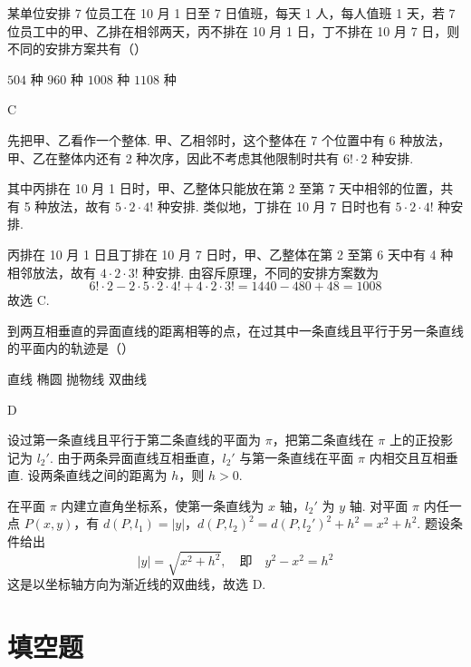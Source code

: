 \begin{problem}
某单位安排 7 位员工在 10 月 1 日至 7 日值班，每天 1 人，每人值班 1 天，若 7 位员工中的甲、乙排在相邻两天，丙不排在 10 月 1 日，丁不排在 10 月 7 日，则不同的安排方案共有（\quad）

\choices
    {\(504\) 种}
    {\(960\) 种}
    {\(1008\) 种}
    {\(1108\) 种}

\begin{answer}
C
\end{answer}

\begin{solution}
先把甲、乙看作一个整体. 甲、乙相邻时，这个整体在 7 个位置中有 6 种放法，甲、乙在整体内还有 2 种次序，因此不考虑其他限制时共有 \(6!\cdot2\) 种安排.

其中丙排在 10 月 1 日时，甲、乙整体只能放在第 2 至第 7 天中相邻的位置，共有 5 种放法，故有 \(5\cdot2\cdot4!\) 种安排. 类似地，丁排在 10 月 7 日时也有 \(5\cdot2\cdot4!\) 种安排.

丙排在 10 月 1 日且丁排在 10 月 7 日时，甲、乙整体在第 2 至第 6 天中有 4 种相邻放法，故有 \(4\cdot2\cdot3!\) 种安排. 由容斥原理，不同的安排方案数为
\[
6!\cdot2-2\cdot5\cdot2\cdot4!+4\cdot2\cdot3!=1440-480+48=1008
\]
故选 C.
\end{solution}
\end{problem}

\begin{problem}
到两互相垂直的异面直线的距离相等的点，在过其中一条直线且平行于另一条直线的平面内的轨迹是（\quad）

\choices
    {直线}
    {椭圆}
    {抛物线}
    {双曲线}

\begin{answer}
D
\end{answer}

\begin{solution}
设过第一条直线且平行于第二条直线的平面为 \(\pi\)，把第二条直线在 \(\pi\) 上的正投影记为 \(l_2'\). 由于两条异面直线互相垂直，\(l_2'\) 与第一条直线在平面 \(\pi\) 内相交且互相垂直. 设两条直线之间的距离为 \(h\)，则 \(h>0\).

在平面 \(\pi\) 内建立直角坐标系，使第一条直线为 \(x\) 轴，\(l_2'\) 为 \(y\) 轴. 对平面 \(\pi\) 内任一点 \(P(x,y)\)，有
\(d(P,l_1)=|y|\)，\(d(P,l_2)^2=d(P,l_2')^2+h^2=x^2+h^2\).
题设条件给出
\[
|y|=\sqrt{x^2+h^2},
\quad\text{即}\quad y^2-x^2=h^2
\]
这是以坐标轴方向为渐近线的双曲线，故选 D.
\end{solution}
\end{problem}

\section{填空题}

